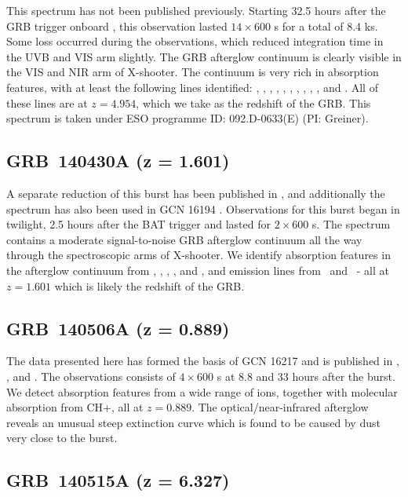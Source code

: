 \documentclass[longauth]{aa}    %
\begin{document}
This spectrum has not been published previously. Starting 32.5 hours after the
GRB trigger onboard \swift, this observation lasted $14\times600$ s for a total
of 8.4 ks. Some loss occurred during the observations, which reduced integration
time in the UVB and VIS arm slightly. The GRB afterglow continuum is clearly
visible in the VIS and NIR arm of X-shooter. The continuum is very rich in
absorption features, with at least the following lines identified: \lyg, \lyb,
\lya, \SIii, \SIiv, \civ, \alii, \aliii, \feii, \mgii, and \mgi. All of these
lines are at $z = 4.954$, which we take as the redshift of the GRB. This spectrum
is taken under ESO programme ID: 092.D-0633(E) (PI: Greiner).

\subsection{GRB~140430A (z = 1.601)}\label{140430}

A separate reduction of this burst has been published in \citet{Kruhler2015},
and additionally the spectrum has also been used in GCN 16194 \citep{GCN16194}.
Observations for this burst began in twilight, 2.5 hours after the BAT trigger
and lasted for $2\times600$ s. The spectrum contains a moderate signal-to-noise
GRB afterglow continuum all the way through the spectroscopic arms of X-shooter.
We identify absorption features in the afterglow continuum from \SIii, \civ,
\alii, \feii, and \mgii, and emission lines from \oii~and \oiii~- all at $z =
1.601$ which is likely the redshift of the GRB.

\subsection{GRB~140506A  (z = 0.889)} \label{140506}

The data presented here has formed the basis of GCN 16217 \citep{GCN16217} and
is published in \citet{Fynbo2014}, \citet{Kruhler2015}, and \citet{Heintz2017a}.
The observations consists of $4\times 600$ s at 8.8 and 33 hours after the
burst. We detect absorption features from a wide range of ions, together with
molecular absorption from CH+, all at $z=0.889$. The optical/near-infrared
afterglow reveals an unusual steep extinction curve which is found to be caused
by dust very close to the burst.

\subsection{GRB~140515A (z = 6.327)}\label{140515}
\end{document}
